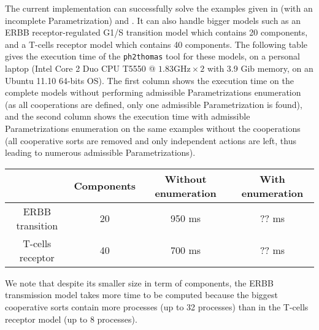 The current implementation can successfully solve the examples given in  (with an incomplete Parametrization) and . It can also handle bigger models such as an ERBB receptor-regulated G1/S transition model  which contains 20 components, and a T-cells receptor model  which contains 40 components.
The following table gives the execution time of the \texttt{ph2thomas} tool for these models, on a personal laptop (Intel Core 2 Duo CPU T5550 @ $1.83\text{GHz} \times 2$ with 3.9 Gib memory, on an Ubuntu 11.10 64-bits OS).
The first column shows the execution time on the complete models without performing admissible Parametrizations enumeration (as all cooperations are defined, only one admissible Parametrization is found), and the second column shows the execution time with admissible Parametrizations enumeration on the same examples without the cooperations (all cooperative sorts are removed and only independent actions are left, thus leading to numerous admissible Parametrizations).
\begin{center}
\begin{tabular}{c|c||c|c|}
  & Components & Without enumeration & With enumeration
\\ \hline
ERBB transition & 20 & 950 ms & ?? ms
\\ \hline
T-cells receptor & 40 & 700 ms & ?? ms
\\ \hline
\end{tabular}
\end{center}
We note that despite its smaller size in term of components, the ERBB transmission model takes more time to be computed because the biggest cooperative sorts contain more processes (up to 32 processes) than in the T-cells receptor model (up to 8 processes).

\begin{comment}
\begin{figure}[t]
\centering
\texttt{[image: figs/tcrsig40.png]}
\caption{\label{fig:tcrsig40-ig}
The IG returned by \texttt{ph2thomas} when used on the T-cell receptor PH model.
}
\end{figure}
In the case of the T-cell receptor model, the inferred IG obtained using the implementation is given in figure \pref{fig:tcrsig40-ig}.
\todo{Give the whole model in annex?}
\end{comment}

